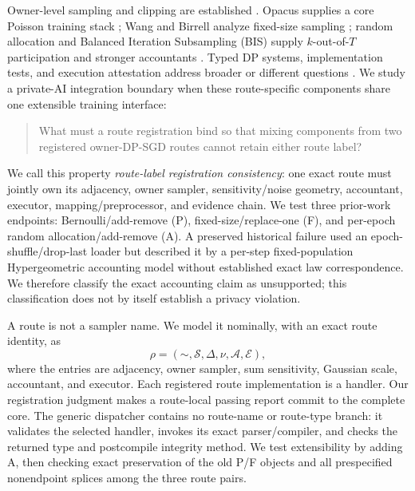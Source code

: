 \documentclass[letterpaper]{article}
\begin{document}
Owner-level sampling and clipping are established
\citep{chua2024mind,ponomareva2023dpfy}.  Opacus supplies a core Poisson
training stack \citep{yousefpour2021opacus}; Wang and Birrell analyze
fixed-size sampling \citep{wang2019subsampled,birrell2024fixed}; random
allocation and Balanced Iteration Subsampling (BIS) supply $k$-out-of-$T$
participation and stronger accountants
\citep{shenfeld2025randomallocation,feldman2026efficientallocation,
dong2026lessrandom}.  Typed DP systems, implementation tests, and execution
attestation address broader or different questions
\citep{hay2020opendp,zhang2020dpcheck,kong2024dpauditorium,
abdolmaleki2026veridp}.  We study a private-AI integration boundary when these
route-specific components share one extensible training interface:

\begin{quote}
What must a route registration bind so that mixing components from two
registered owner-DP-SGD routes cannot retain either route label?
\end{quote}

We call this property \emph{route-label registration consistency}: one exact
route must jointly own its adjacency, owner sampler, sensitivity/noise geometry,
accountant, executor, mapping/preprocessor, and evidence chain.  We test three
prior-work endpoints: Bernoulli/add-remove (P), fixed-size/replace-one (F), and
per-epoch random allocation/add-remove (A).  A preserved historical failure
used an epoch-shuffle/drop-last loader but described it by a per-step
fixed-population Hypergeometric accounting model without established exact law
correspondence.  We therefore classify the exact
accounting claim as unsupported; this classification does not by itself
establish a privacy violation.

A route is not a sampler name.  We model it nominally, with an exact route
identity, as
\[
 \rho=(\mathord{\sim},\mathcal S,\Delta,\nu,\mathcal A,\mathcal E),
\]
where the entries are adjacency, owner sampler, sum sensitivity, Gaussian
scale, accountant, and executor.  Each registered route implementation is a
handler.  Our registration judgment makes a route-local passing report commit
to the complete core.  The generic dispatcher contains no route-name or
route-type branch: it validates the selected handler, invokes its exact
parser/compiler, and checks the returned type and postcompile integrity method.
We test extensibility by adding A, then checking exact preservation of the old
P/F objects and all prespecified nonendpoint splices among the three route pairs.
\end{document}
